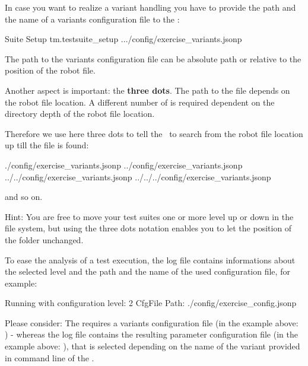 In case you want to realize a variant handling you have to provide the path and the name of a variants configuration file to the :

\begin{robotcode}
Suite Setup    tm.testsuite_setup    .../config/exercise_variants.jsonp
\end{robotcode}

The path to the variants configuration file can be absolute path or relative to the position of the robot file.

Another aspect is important: the \textbf{three dots}.
The path to the  file depends on the robot file location. A
different number of  is required dependent on the directory depth of the robot file location.

Therefore we use here three dots to tell the \pkg\ to search from the robot
file location up till the  file is found:

\begin{pythonlog}
./config/exercise_variants.jsonp
../config/exercise_variants.jsonp
../../config/exercise_variants.jsonp
../../../config/exercise_variants.jsonp
\end{pythonlog}

and so on.

Hint: You are free to move your test suites one or more level up or down in the file system, but using the
three dots notation enables you to let the position of the  folder unchanged.

To ease the analysis of a test execution, the log file contains informations about the selected level and the path and the name of the used
configuration file, for example:

\begin{robotlog}
Running with configuration level: 2
CfgFile Path: ./config/exercise_config.jsonp
\end{robotlog}

Please consider: The  requires a variants configuration file (in the example above: ) - whereas
the log file contains the resulting parameter configuration file (in the example above: ), that is selected depending
on the name of the variant provided in command line of the \rfwcore.

\newpage

